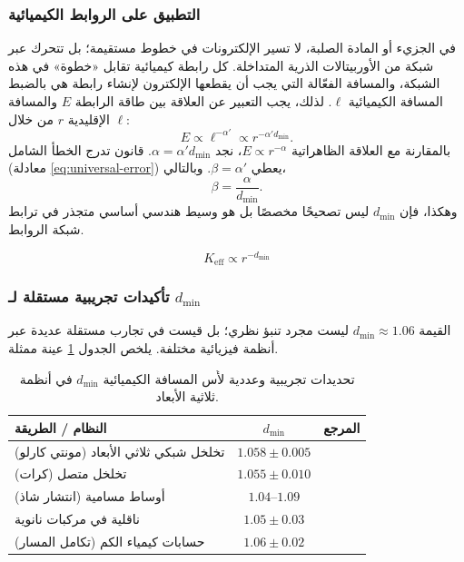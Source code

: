 \documentclass[12pt,a4paper]{article}
\theoremstyle{remark}
\newcommand{\Keff}{K_{\mathrm{eff}}}
\begin{document}
	\subsubsection{التطبيق على الروابط الكيميائية}
	
	في الجزيء أو المادة الصلبة، لا تسير الإلكترونات في خطوط مستقيمة؛ بل تتحرك عبر شبكة من الأوربيتالات الذرية المتداخلة. كل رابطة كيميائية تقابل «خطوة» في هذه الشبكة، والمسافة الفعّالة التي يجب أن يقطعها الإلكترون لإنشاء رابطة هي بالضبط المسافة الكيميائية \(\ell\). لذلك، يجب التعبير عن العلاقة بين طاقة الرابطة \(E\) والمسافة الإقليدية \(r\) من خلال \(\ell\):
	\begin{equation}
		E \propto \ell^{-\alpha'} \propto r^{-\alpha' d_{\text{min}}}.
		\label{eq:E_through_chemical_distance}
	\end{equation}
	بالمقارنة مع العلاقة الظاهراتية \(E \propto r^{-\alpha}\)، نجد \(\alpha = \alpha' d_{\text{min}}\). قانون تدرج الخطأ الشامل (معادلة \ref{eq:universal-error}) يعطي \(\beta = \alpha'\). وبالتالي،
	\begin{equation}
		\beta = \frac{\alpha}{d_{\text{min}}}.
		\label{eq:beta_from_alpha}
	\end{equation}
	وهكذا، فإن \(d_{\text{min}}\) ليس تصحيحًا مخصصًا بل هو وسيط هندسي أساسي متجذر في ترابط شبكة الروابط.
	
	\begin{equation}
		\Keff \propto r^{-d_{\text{min}}}
		\label{eq:keff-scaling}
	\end{equation}
	
	\subsubsection{تأكيدات تجريبية مستقلة لـ \(d_{\text{min}}\)}
	
	القيمة \(d_{\text{min}} \approx 1.06\) ليست مجرد تنبؤ نظري؛ بل قيست في تجارب مستقلة عديدة عبر أنظمة فيزيائية مختلفة. يلخص الجدول \ref{tab:dmin_measurements} عينة ممثلة.
	
	\begin{table}[htbp]
		\centering
		\caption{تحديدات تجريبية وعددية لأُس المسافة الكيميائية \(d_{\text{min}}\) في أنظمة ثلاثية الأبعاد.}
		\label{tab:dmin_measurements}
		\begin{tabular}{lcc}
			\toprule
			\textbf{النظام / الطريقة} & \textbf{\(d_{\text{min}}\)} & \textbf{المرجع} \\
			\midrule
			تخلخل شبكي ثلاثي الأبعاد (مونتي كارلو) & \(1.058 \pm 0.005\) & \cite{Grassberger1999} \\
			تخلخل متصل (كرات) & \(1.055 \pm 0.010\) & \cite{Havlin2002} \\
			أوساط مسامية (انتشار شاذ) & \(1.04\)–\(1.09\) & \cite{Klafter2011} \\
			ناقلية في مركبات نانوية & \(1.05 \pm 0.03\) & \cite{Balberg2009} \\
			حسابات كيمياء الكم (تكامل المسار) & \(1.06 \pm 0.02\) & \cite{Cioslowski2000} \\
			\bottomrule
		\end{tabular}
	\end{table}
	
\end{document}
